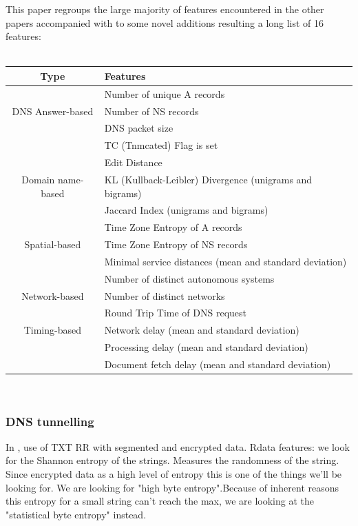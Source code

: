 This paper\cite{ff5} regroups the large majority of features encountered in the other papers accompanied with to some novel additions resulting a long list of 16 features: \\\\
\begin{tabular}{c|l}
Type & Features\\
\hline
 & Number of unique A records\\
DNS Answer-based &  Number of NS records\\
 & DNS packet size\\
 & TC (Tnmcated) Flag is set\\
\hline
 & Edit Distance\\
Domain name-based & KL (Kullback-Leibler) Divergence (unigrams and bigrams)\\
 & Jaccard Index (unigrams and bigrams)\\
\hline
 & Time Zone Entropy of A records\\
Spatial-based & Time Zone Entropy of NS records\\
 & Minimal service distances (mean and standard deviation)\\
\hline
 & Number of distinct autonomous systems\\
Network-based & Number of distinct networks\\
 \hline
 & Round Trip Time of DNS request\\
Timing-based & Network delay (mean and standard deviation)\\
& Processing delay (mean and standard deviation)\\
& Document fetch delay (mean and standard deviation)\\
\end{tabular}
\\


\subsubsection{DNS tunnelling}
In \cite{tunn1}, use of TXT RR with segmented and encrypted data.
Rdata features: we look for the Shannon entropy of the strings. Measures the randomness of the string. Since encrypted data as a high level of entropy this is one of the things we'll be looking for. We are looking for "high byte entropy".Because of inherent reasons this entropy for a small string can't reach the max, we are looking at the "statistical byte entropy" instead.

